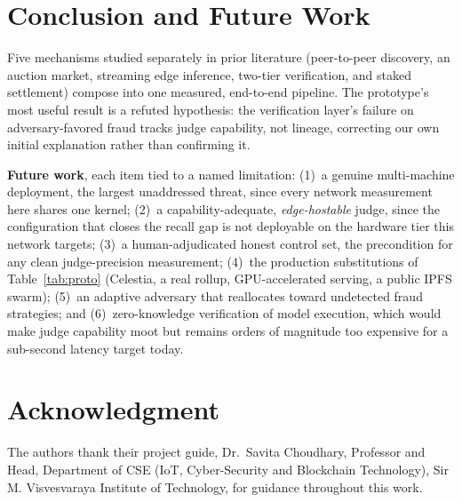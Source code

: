 \documentclass[conference]{IEEEtran}
\begin{document}
\section{Conclusion and Future Work}

Five mechanisms studied separately in prior literature (peer-to-peer discovery, an auction market,
streaming edge inference, two-tier verification, and staked settlement) compose into one measured,
end-to-end pipeline. The prototype's most useful result is a refuted hypothesis: the verification
layer's failure on adversary-favored fraud tracks judge capability, not lineage, correcting our own
initial explanation rather than confirming it.

\textbf{Future work}, each item tied to a named limitation: (1)~a genuine multi-machine deployment,
the largest unaddressed threat, since every network measurement here shares one kernel; (2)~a
capability-adequate, \emph{edge-hostable} judge, since the configuration that closes the recall gap
is not deployable on the hardware tier this network targets; (3)~a human-adjudicated honest control
set, the precondition for any clean judge-precision measurement; (4)~the production substitutions
of Table~\ref{tab:proto} (Celestia, a real rollup, GPU-accelerated serving, a public IPFS swarm);
(5)~an adaptive adversary that reallocates toward undetected fraud strategies; and
(6)~zero-knowledge verification of model execution, which would make judge capability moot but
remains orders of magnitude too expensive for a sub-second latency target today.

\section*{Acknowledgment}

The authors thank their project guide, Dr.\ Savita Choudhary, Professor and Head, Department of
CSE (IoT, Cyber-Security and Blockchain Technology), Sir M. Visvesvaraya Institute of Technology,
for guidance throughout this work.
\end{document}
